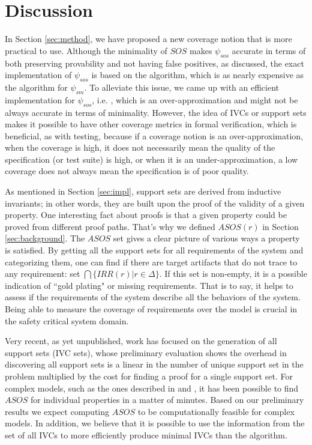 \section{Discussion}
\label{sec:discussion}

In Section \ref{sec:method}, we have proposed a new coverage notion that
is more practical to use. Although the minimality of $SOS$ makes $\psi_{sos}$ accurate 
in terms of both preserving provability and not having false positives, as discussed, the exact implementation of $\psi_{sos}$ is based on the \ucbfalg algorithm, which is as nearly expensive as the \mustalg algorithm for $\psi_{sm}$.
 To alleviate this issue, we came up with an efficient implementation for $\psi_{sos}$, i.e. \ucalg \cite{Ghass16}, 
 which is an over-approximation and might not be always accurate in terms of minimality. 
 However, the idea of IVCs or support sets makes
it possible to have other coverage metrics in formal verification, which is beneficial, as with testing, because if a
coverage notion is an over-approximation, when the coverage
 is high, it does not necessarily mean the quality of
 the specification (or test suite) is high, or when it is an under-approximation, a low coverage does not always mean the specification is of poor quality.

 As mentioned in Section \ref{sec:impl}, support sets are derived from inductive invariants; in other words, they are built upon the proof of the validity of a given property. One interesting fact about proofs
  is that a given property could be proved from different proof paths. That's why we defined $ASOS(r)$ in Section \ref{sec:background}. The $ASOS$ set gives a clear picture of various ways a property is satisfied. By getting all the support sets for all requirements of the system and categorizing them, one can find if there are target artifacts that do not trace to any requirement: set $\bigcap \{IRR (r) | r \in \Delta \}$.  If this set is non-empty, it is a possible indication of ``gold plating" or missing requirements. That is to say, it helps to assess if the requirements of the system describe all the behaviors of the system. Being able to measure the coverage of requirements over the model is crucial in the safety critical system domain.

Very recent, as yet unpublished, work has focused on the
generation of all support sets (IVC sets), whose preliminary evaluation
shows the overhead in discovering all support sets is a linear in the
number of unique support set in the problem multiplied by the cost
for finding a proof for a single support set. For complex models, such
as the ones described in \cite {QFCS15:backes} and \cite{hilt2013}, it has been possible to
find $ASOS$ for individual properties in a matter of minutes.
Based on our preliminary results we expect computing $ASOS$ to be computationally feasible for complex models. In
addition, we believe that it is possible to use the information
from the set of all IVCs to more efficiently produce minimal
IVCs than the \ucbfalg algorithm.

